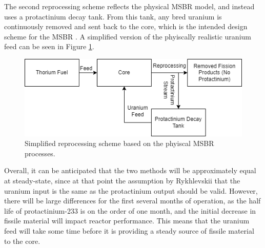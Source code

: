 The second reprocessing scheme reflects the physical MSBR model, and instead uses a protactinium decay tank. From this tank, any bred uranium is continuously removed and sent back to the core, which is the intended design scheme for the MSBR \cite{robertson_conceptual_1971}. A simplified version of the phyiscally realistic uranium feed can be seen in Figure \ref{fig:nonspmatchrepr}.

\begin{figure}[H]
  \centering
  \includegraphics[scale=0.7]{images/phys-repr-scheme.png}
  \caption{Simplified reprocessing scheme based on the phyiscal MSBR processes.}
   \label{fig:nonspmatchrepr}
\end{figure}

Overall, it can be anticipated that the two methods will be approximately equal at steady-state, since at that point the assumption by Rykhlevskii that the uranium input is the same as the protactinium output should be valid. However, there will be large differences for the first several months of operation, as the half life of protactinium-233 is on the order of one month, and the initial decrease in fissile material will impact reactor performance. This means that the uranium feed will take some time before it is providing a steady source of fissile material to the core.

